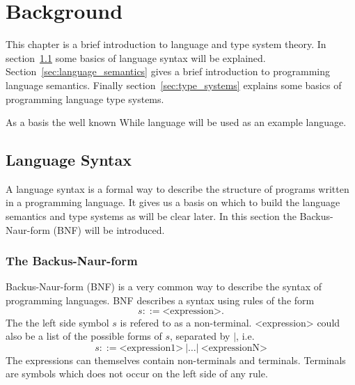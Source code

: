 \chapter{Background} \label{cha:background}

This chapter is a brief introduction to language and type system theory. In
section~\ref{sec:language_syntax} some basics of language syntax will be
explained. Section~\ref{sec:language_semantics} gives a brief introduction to
programming language semantics. Finally section~\ref{sec:type_systems} explains
some basics of programming language type systems.

As a basis the well known While language will be used as an example language.


\section{Language Syntax} \label{sec:language_syntax}

A language syntax is a formal way to describe the structure of programs written
in a programming language. It gives us a basis on which to build the language
semantics and type systems as will be clear later. In this section the
Backus-Naur-form (BNF) will be introduced. 

\subsection{The Backus-Naur-form} \label{sub:the_backus_naur_form} 

Backus-Naur-form (BNF) is a very common way to describe the syntax of
programming languages. BNF describes a syntax using rules of the form
\begin{equation*}
  s ::= \text{<expression>}.
\end{equation*}
The the left side symbol $s$ is refered to as a non-terminal. <expression> could
also be a list of the
possible forms of $s$, separated by $|$, i.e. 
\begin{equation*}
  s ::= \text{<expression1>} \: | \dots | \: \text{<expressionN>}
\end{equation*}
The expressions can themselves contain non-terminals and terminals.
Terminals are symbols which does not occur on the left side of any rule.

